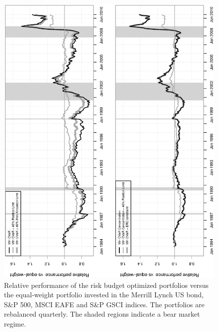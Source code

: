 \documentclass[11pt]{article}
\begin{document}
\begin{figure}[tb]
\begin{center}
\caption{Relative performance of the risk budget optimized portfolios versus the equal-weight portfolio invested in the Merrill Lynch US bond, S\&P 500, MSCI EAFE and S\&P GSCI indices. The portfolios are rebalanced quarterly. The shaded regions indicate a bear market regime.  }
\includegraphics[width=12cm,angle=270]{RelPerf_EW.eps}
\end{center}
\end{figure}

\newpage
\end{document}
